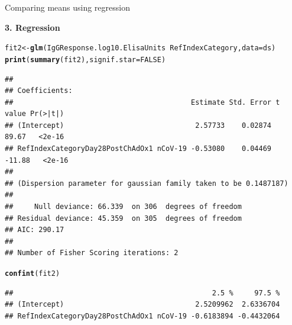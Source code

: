 \documentclass[10pt,handout]{beamer}\usepackage[]{graphicx}\usepackage[]{color}
\makeatletter
\newcommand{\hlnum}[1]{\textcolor[rgb]{0.686,0.059,0.569}{#1}}%
\newcommand{\hlopt}[1]{\textcolor[rgb]{0,0,0}{#1}}%
\newcommand{\hlstd}[1]{\textcolor[rgb]{0.345,0.345,0.345}{#1}}%
\newcommand{\hlkwb}[1]{\textcolor[rgb]{0.69,0.353,0.396}{#1}}%
\newcommand{\hlkwc}[1]{\textcolor[rgb]{0.333,0.667,0.333}{#1}}%
\newcommand{\hlkwd}[1]{\textcolor[rgb]{0.737,0.353,0.396}{\textbf{#1}}}%
\newenvironment{kframe}{%
 \def\at@end@of@kframe{}%
 \ifinner\ifhmode%
  \def\at@end@of@kframe{\end{minipage}}%
  \begin{minipage}{\columnwidth}%
 \fi\fi%
 \def\FrameCommand##1{\hskip\@totalleftmargin \hskip-\fboxsep
 \colorbox{shadecolor}{##1}\hskip-\fboxsep
     \hskip-\linewidth \hskip-\@totalleftmargin \hskip\columnwidth}%
 \MakeFramed {\advance\hsize-\width
   \@totalleftmargin\z@ \linewidth\hsize
   \@setminipage}}%
 {\par\unskip\endMakeFramed%
 \at@end@of@kframe}
\newenvironment{knitrout}{}{} %
\makeatother
\begin{document}
\begin{frame}[fragile]{Comparing means using regression}
	
\textbf{3. Regression} \\
	
\begin{knitrout}\tiny
{}\color{fgcolor}\begin{kframe}
\begin{alltt}
\hlstd{fit2} \hlkwb{<-} \hlkwd{glm}\hlstd{(IgGResponse.log10.ElisaUnits} \hlopt{~} \hlstd{RefIndexCategory,} \hlkwc{data} \hlstd{= ds)}
\hlkwd{print}\hlstd{(}\hlkwd{summary}\hlstd{(fit2),} \hlkwc{signif.star} \hlstd{=} \hlnum{FALSE}\hlstd{)}
\end{alltt}
\begin{verbatim}
## 
## Coefficients:
##                                          Estimate Std. Error t value Pr(>|t|)
## (Intercept)                               2.57733    0.02874   89.67   <2e-16
## RefIndexCategoryDay28PostChAdOx1 nCoV-19 -0.53080    0.04469  -11.88   <2e-16
## 
## (Dispersion parameter for gaussian family taken to be 0.1487187)
## 
##     Null deviance: 66.339  on 306  degrees of freedom
## Residual deviance: 45.359  on 305  degrees of freedom
## AIC: 290.17
## 
## Number of Fisher Scoring iterations: 2
\end{verbatim}
\begin{alltt}
\hlkwd{confint}\hlstd{(fit2)}
\end{alltt}
\begin{verbatim}
##                                               2.5 %     97.5 %
## (Intercept)                               2.5209962  2.6336704
## RefIndexCategoryDay28PostChAdOx1 nCoV-19 -0.6183894 -0.4432064
\end{verbatim}
\end{kframe}
\end{knitrout}

\end{frame}
\end{document}
